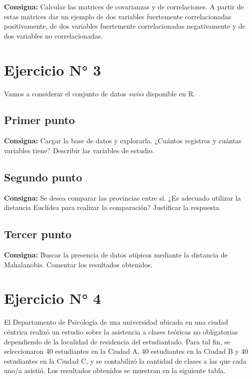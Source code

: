 \documentclass{article} %
\begin{document}
\textbf{Consigna:} Calcular las matrices de covarianzas y de correlaciones. A partir de estas matrices dar un ejemplo de dos variables fuertemente correlacionadas positivamente, de dos variables fuertemente correlacionadas negativamente y de dos variables no correlacionadas.

\section{Ejercicio N° 3}
Vamos a considerar el conjunto de datos \textit{swiss} disponible en R.

\subsection{Primer punto}

\textbf{Consigna:} Cargar la base de datos y explorarla. ¿Cuántos registros y cuántas variables tiene? Describir las variables de estudio.

\subsection{Segundo punto}

\textbf{Consigna:} Se desea comparar las provincias entre sí. ¿Es adecuado utilizar la distancia Euclídea para realizar la comparación? Justificar la respuesta.


\subsection{Tercer punto}

\textbf{Consigna:} Buscar la presencia de datos atípicos mediante la distancia de Mahalanobis. Comentar los resultados obtenidos.


\section{Ejercicio N° 4}
El Departamento de Psicología de una universidad ubicada en una ciudad céntrica realizó un estudio sobre la asistencia a clases teóricas no obligatorias dependiendo de la localidad de residencia del estudiantado. Para tal fin, se seleccionaron 40 estudiantes en la Ciudad A, 40 estudiantes en la Ciudad B y 40 estudiantes en la Ciudad C, y se contabilizó la cantidad de clases a las que cada uno/a asistió. Los resultados obtenidos se muestran en la siguiente tabla.
\end{document}
